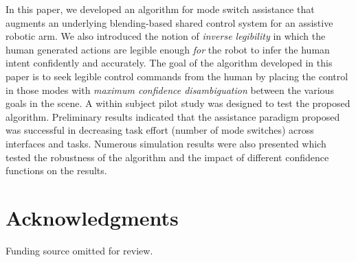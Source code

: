 \documentclass[conference]{IEEEtran}
\begin{document}
In this paper, we developed an algorithm for mode switch assistance that augments an underlying blending-based shared control system for an assistive robotic arm. We also introduced the notion of  \textit{inverse legibility} in which the human generated actions are legible enough \textit{for} the robot to infer the human intent confidently and accurately. The goal of the algorithm developed in this paper is to seek legible control commands from the human by placing the control in those modes with \textit{maximum confidence disambiguation} between the various goals in the scene. A within subject pilot study was designed to test the proposed algorithm. Preliminary results indicated that the assistance paradigm proposed was successful in decreasing task effort (number of mode switches) across interfaces and tasks. Numerous simulation results were also presented which tested the robustness of the algorithm and the impact of different confidence functions on the results. 

\section*{Acknowledgments}
Funding source omitted for review. 
%
\end{document}
